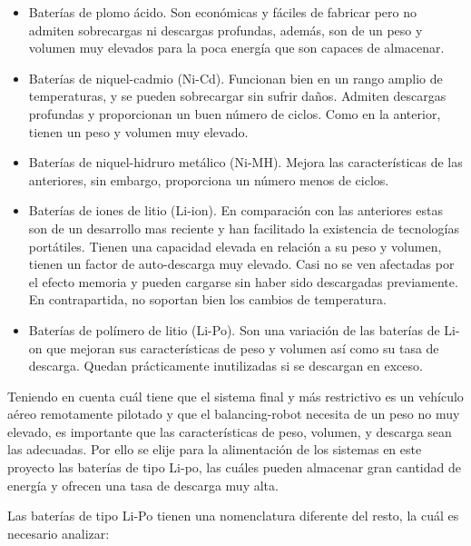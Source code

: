 \begin{itemize}
	\item Baterías de plomo ácido. Son económicas y fáciles de fabricar pero no admiten sobrecargas ni descargas profundas, además, son de un peso y volumen muy elevados para la poca energía que son capaces de almacenar.
	\item Baterías de niquel-cadmio (Ni-Cd). Funcionan bien en un rango amplio de temperaturas, y se pueden sobrecargar sin sufrir daños. Admiten descargas profundas y proporcionan un buen número de ciclos. Como en la anterior, tienen un peso y volumen muy elevado.
	\item Baterías de niquel-hidruro metálico (Ni-MH). Mejora las características de las anteriores, sin embargo, proporciona un número menos de ciclos.
	\item Baterías de iones de litio (Li-ion). En comparación con las anteriores estas son de un desarrollo mas reciente y han facilitado la existencia de tecnologías portátiles. Tienen una capacidad elevada en relación a su peso y volumen, tienen un factor de auto-descarga muy elevado. Casi no se ven afectadas por el efecto memoria y pueden cargarse sin haber sido descargadas previamente. En contrapartida, no soportan bien los cambios de temperatura. 
	\item Baterías de polímero de litio (Li-Po). Son una variación de las baterías de Li-on que mejoran sus características de peso y volumen así como su tasa de descarga. Quedan prácticamente inutilizadas si se descargan en exceso.
\end{itemize}

Teniendo en cuenta cuál tiene que el sistema final y más restrictivo es un vehículo aéreo remotamente pilotado y que el balancing-robot necesita de un peso no muy elevado, es importante que las características de peso, volumen, y descarga sean las adecuadas. Por ello se elije para la alimentación de los sistemas en este proyecto las baterías de tipo Li-po, las cuáles pueden almacenar gran cantidad de energía y ofrecen una tasa de descarga muy alta. \newline

Las baterías de tipo Li-Po tienen una nomenclatura diferente del resto, la cuál es necesario analizar:

